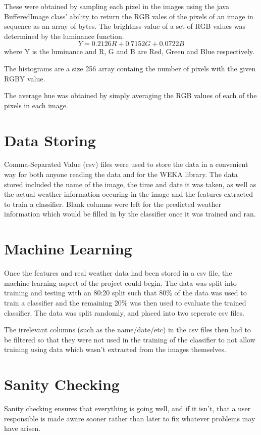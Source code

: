 \documentclass[a4paper,12pt,twoside]{report}
\begin{document}
These were obtained by sampling each pixel in the images using the java BufferedImage\cite{x} class' ability to return the RGB vales of the pixels of an image in sequence as an array of bytes.
The brightnss value of a set of RGB values was determined by the luminance function\cite{x}.
$$Y = 0.2126R + 0.7152G + 0.0722B$$
where Y is the luminance and R, G and B are Red, Green and Blue respectively.

The histograms are a size 256 array containg the number of pixels with the given RGBY value.

The average hue was obtained by simply averaging the RGB values of each of the pixels in each image.

\section{Data Storing}
Comma-Separated Value (csv) files were used to store the data in a convenient way for both anyone reading the data and for the WEKA library. The data stored included the name of the image, the time and date it was taken, as well as the actual weather information occuring in the image and the features extracted to train a classifier. Blank columns were left for the predicted weather information which would be filled in by the classifier once it was trained and ran.

\section{Machine Learning}
Once the features and real weather data had been stored in a csv file, the machine learning aspect of the project could begin. The data was split into training and testing with an 80:20 split such that 80\% of the data was used to train a classifier and the remaining 20\% was then used to evaluate the trained classifier. The data was split randomly, and placed into two seperate csv files.

The irrelevant columns (such as the name/date/etc) in the csv files then had to be filtered so that they were not used in the training of the classifier to not allow training using data which wasn't extracted from the images themselves.
 
\section{Sanity Checking}
Sanity checking ensures that everything is going well, and if it isn't, that a user responsible is made aware sooner rather than later to fix whatever problems may have arisen.
\end{document}
